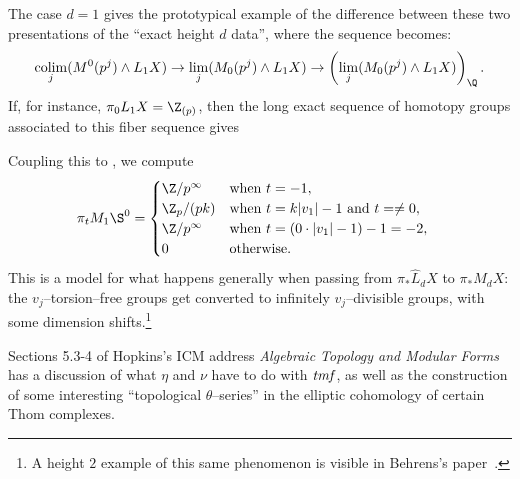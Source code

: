 \begin{remark}
The case $d = 1$ gives the prototypical example of the difference between these two presentations of the ``exact height $d$ data'', where the sequence becomes: \[\colim_j (M^0(p^j) \sm L_1 X) \to \lim_j (M_0(p^j) \sm L_1 X) \to \left( \lim_j (M_0(p^j) \sm L_1 X) \right)_{\Q}.\]  If, for instance, $\pi_0 L_1 X = \Z_{(p)}$, then the long exact sequence of homotopy groups associated to this fiber sequence gives
\begin{center}
\end{center}
Coupling this to , we compute
\begin{align*}
\pi_t M_1 \S^0 & = \begin{cases} \Z/p^\infty & \text{when $t = -1$}, \\ \Z_p / (pk) & \text{when $t = k|v_1| - 1$ and $t = \ne 0$}, \\ \Z/p^\infty & \text{when $t = (0 \cdot |v_1| - 1) - 1 = -2$}, \\ 0 & \text{otherwise}. \end{cases}
\end{align*}
This is a model for what happens generally when passing from $\pi_* \widehat L_d X$ to $\pi_* M_d X$: the $v_j$--torsion--free groups get converted to infinitely $v_j$--divisible groups, with some dimension shifts.\footnote{A height $2$ example of this same phenomenon is visible in Behrens's paper~\cite[Section 7]{BehrensRevisited}.}
\end{remark}



Sections 5.3-4 of Hopkins's ICM address \textit{Algebraic Topology and Modular Forms} has a discussion of what $\eta$ and $\nu$ have to do with $\mathit{tmf}$, as well as the construction of some interesting ``topological $\theta$--series'' in the elliptic cohomology of certain Thom complexes.



